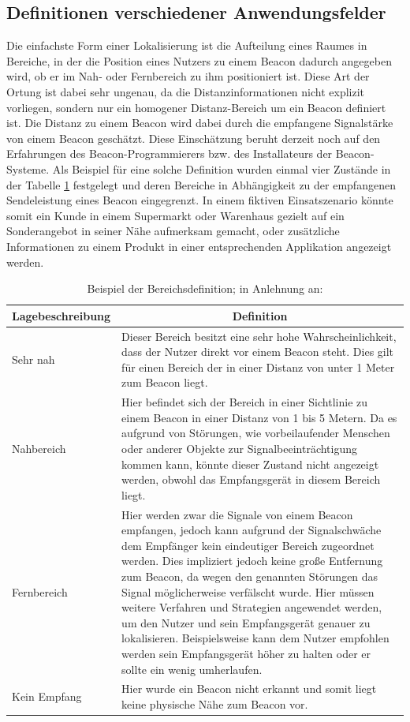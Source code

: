 \subsection{Definitionen verschiedener Anwendungsfelder}
Die einfachste Form einer Lokalisierung ist die Aufteilung eines Raumes in Bereiche, in der die Position eines Nutzers zu einem Beacon dadurch angegeben wird, ob er im Nah- oder Fernbereich zu ihm positioniert ist. Diese Art der Ortung ist dabei sehr ungenau, da die Distanzinformationen nicht explizit vorliegen, sondern nur ein homogener Distanz-Bereich um ein Beacon definiert ist. Die Distanz zu einem Beacon wird dabei durch die empfangene Signalstärke von einem Beacon geschätzt. Diese Einschätzung beruht derzeit noch auf den Erfahrungen des Beacon-Programmierers bzw. des Installateurs der Beacon-Systeme. Als Beispiel für eine solche Definition wurden einmal vier Zustände in der Tabelle \ref{table:Ranging} festgelegt und deren Bereiche in Abhängigkeit zu der empfangenen Sendeleistung eines Beacon eingegrenzt. In einem fiktiven Einsatszenario könnte somit ein Kunde in einem Supermarkt oder Warenhaus gezielt auf ein Sonderangebot in seiner Nähe aufmerksam gemacht, oder zusätzliche Informationen zu einem Produkt in einer entsprechenden Applikation angezeigt werden.    
\begin{table}[H]
\centering
\begin{tabular}{|>{\centering}p{4cm}|m{12cm}|}
\hline
\rowcolor{gray} \textbf{Lagebeschreibung} & \multicolumn{1}{c}{\textbf{Definition}} \\ \hline
Sehr nah & Dieser Bereich besitzt eine sehr hohe Wahrscheinlichkeit, dass der Nutzer direkt vor einem Beacon steht. Dies gilt für einen Bereich der in einer Distanz von unter 1 Meter zum Beacon liegt. \\ \hline
Nahbereich & Hier befindet sich der Bereich in einer Sichtlinie zu einem Beacon in einer Distanz von 1 bis 5 Metern. Da es aufgrund von Störungen, wie vorbeilaufender Menschen oder anderer Objekte zur Signalbeeinträchtigung kommen kann, könnte dieser Zustand nicht angezeigt werden, obwohl das Empfangsgerät in diesem Bereich liegt.\\ \hline
Fernbereich & Hier werden zwar die Signale von einem Beacon empfangen, jedoch kann aufgrund der Signalschwäche dem Empfänger kein eindeutiger Bereich zugeordnet werden. Dies impliziert jedoch keine große Entfernung zum Beacon, da wegen den genannten Störungen das Signal möglicherweise verfälscht wurde. Hier müssen weitere Verfahren und Strategien angewendet werden, um den Nutzer und sein Empfangsgerät genauer zu lokalisieren. Beispielsweise kann dem Nutzer empfohlen werden sein Empfangsgerät höher zu halten oder er sollte ein wenig umherlaufen.\\ \hline
Kein Empfang & Hier wurde ein Beacon nicht erkannt und somit liegt keine physische Nähe zum Beacon vor.\\ \hline
\end{tabular}
\caption{Beispiel der Bereichsdefinition; in Anlehnung an: \cite{GSwiB}}
\label{table:Ranging}
\end{table}
